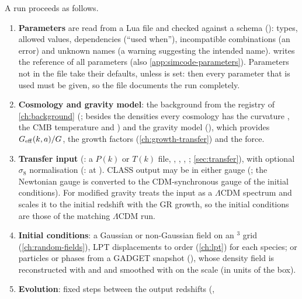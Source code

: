 A run proceeds as follows.
\begin{enumerate}
\item \textbf{Parameters} are read from a Lua file and checked against a schema (): types,
      allowed values, dependencies (``used when''), incompatible combinations (an error) and unknown names (a warning
      suggesting the intended name).  writes the reference of all parameters
      (also \cref{app:simcode-parameters}). Parameters not in the file take their defaults, unless
       is set: then every parameter that is used must be given, so the file
      documents the run completely.
\item \textbf{Cosmology and gravity model}: the background from the registry of \cref{ch:background}
      (; besides the densities every cosmology has the curvature , the CMB
      temperature  and ) and the gravity model (), which provides
      $G_{\rm eff}(k,a)/G$, the growth factors (\cref{ch:growth-transfer}) and the force.
\item \textbf{Transfer input} (: a $P(k)$ or $T(k)$ file, , ,
      , ; \cref{sec:transfer}), with optional $\sigma_8$ normalisation
      (:  at ). CLASS output may be in either gauge
      (; the Newtonian gauge is converted to the CDM-synchronous gauge of the initial conditions).
      For modified gravity  treats the input as a $\Lambda$CDM spectrum and scales it to
      the initial redshift with the GR growth, so the initial conditions are those of the matching $\Lambda$CDM run.
\item \textbf{Initial conditions}: a Gaussian or non-Gaussian field on an $^3$ grid
      (\cref{ch:random-fields}), LPT displacements to order  (\cref{ch:lpt}) for each species; or
      particles or phases from a GADGET snapshot (), whose density field is
      reconstructed with  and  and smoothed with
       on the scale  (in units of the
      box).
\item \textbf{Evolution}: fixed steps between the output redshifts (,

\end{enumerate}
